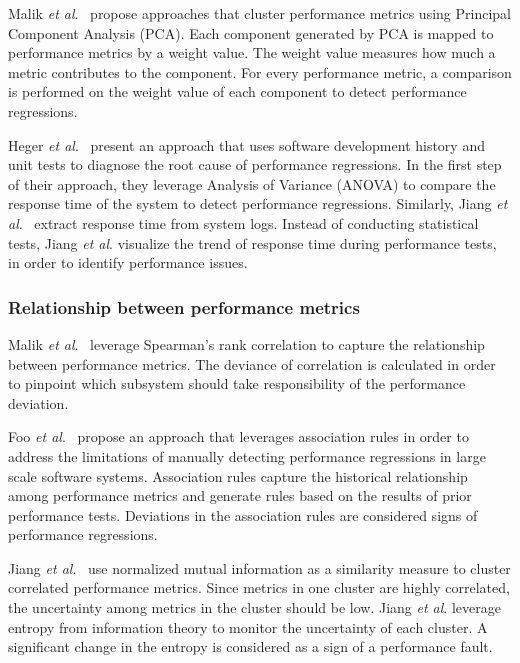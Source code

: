 Malik \emph{et al$.$}~\cite{Malik:2010:ACL:1955601.1955936, haroon} propose approaches that cluster performance metrics using Principal Component Analysis (PCA). Each component generated by PCA is mapped to performance metrics by a weight value. The weight value measures how much a metric contributes to the component. For every performance metric, a comparison is performed on the weight value of each component to detect performance regressions.

Heger \emph{et al$.$}~\cite{DBLP:conf/wosp/HegerHF13} present an approach that uses software development history and unit tests to diagnose the root cause of performance regressions. In the first step of their approach, they leverage Analysis of Variance (ANOVA) to compare the response time of the system to detect performance regressions. Similarly, Jiang \emph{et al$.$}~\cite{jackicsm2009} extract response time from system logs. Instead of conducting statistical tests, Jiang \emph{et al$.$} visualize the trend of response time during performance tests, in order to identify performance issues.


\subsubsection{Relationship between performance metrics}
\label{sec:relatedrelation}

Malik \emph{et al$.$}~\cite{5635038} leverage Spearman's rank correlation to capture the relationship between performance metrics. The deviance of correlation is calculated in order to pinpoint which subsystem should take responsibility of the performance deviation.

Foo \emph{ et al$.$}~\cite{foo2010mining} propose an approach that leverages association rules in order to address the limitations of manually detecting performance regressions in large scale software systems. Association rules capture the historical relationship among performance metrics and generate rules based on the results of prior performance tests. Deviations in the association rules are considered signs of performance regressions.

Jiang \emph{et al$.$}~\cite{5270324} use normalized mutual information as a similarity measure to cluster correlated performance metrics. Since metrics in one cluster are highly correlated, the uncertainty among metrics in the cluster should be low. Jiang \emph{et al$.$} leverage entropy from information theory to monitor the uncertainty of each cluster. A significant change in the entropy is considered as a sign of a performance fault. 


